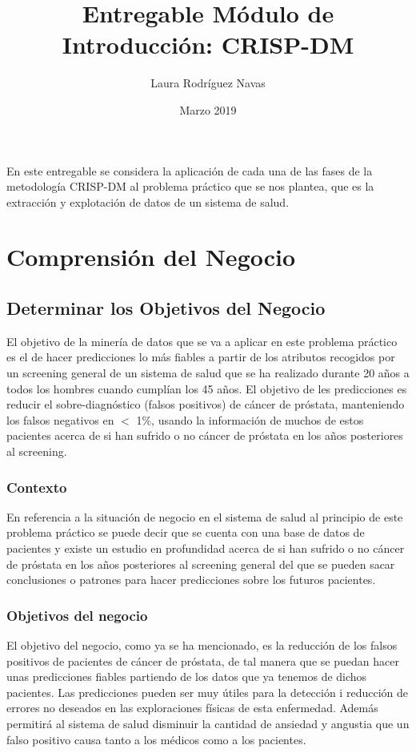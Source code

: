 \documentclass{article}
\title{Entregable Módulo de Introducción: CRISP-DM}
\author{Laura Rodríguez Navas}
\date{Marzo 2019}
\begin{document}
\maketitle

En este entregable se considera la aplicación de cada una de las fases de la metodología CRISP-DM al problema práctico que se nos plantea, que es la extracción y explotación de datos de un sistema de salud.

\section{Comprensión del Negocio}

\subsection{Determinar los Objetivos del Negocio}
El objetivo de la minería de datos que se va a aplicar en este problema práctico es el de hacer predicciones lo más fiables a partir de los atributos recogidos por un screening general de un sistema de salud que se ha realizado durante 20 años a todos los hombres cuando cumplían los 45 años. El objetivo de les predicciones es reducir el sobre-diagnóstico (falsos positivos) de cáncer de próstata, manteniendo los falsos negativos en $<$ 1\%, usando la información de muchos de estos pacientes acerca de si han sufrido o no cáncer de próstata en los años posteriores al screening.

\subsubsection{Contexto}
En referencia a la situación de negocio en el sistema de salud al principio de este problema práctico se puede decir que se cuenta con una base de datos de pacientes y existe un estudio en profundidad acerca de si han sufrido o no cáncer de próstata en los años posteriores al screening general del que se pueden sacar conclusiones o patrones para hacer predicciones sobre los futuros pacientes.

\subsubsection{Objetivos del negocio}
El objetivo del negocio, como ya se ha mencionado, es la reducción de los falsos positivos de pacientes de cáncer de próstata, de tal manera que se puedan hacer unas predicciones fiables partiendo de los datos que ya tenemos de dichos pacientes. Las predicciones pueden ser muy útiles para la detección i reducción de errores no deseados en las exploraciones físicas de esta enfermedad. Además permitirá al sistema de salud disminuir la cantidad de ansiedad y angustia que un falso positivo causa tanto a los médicos como a los pacientes.
	
\end{document}
